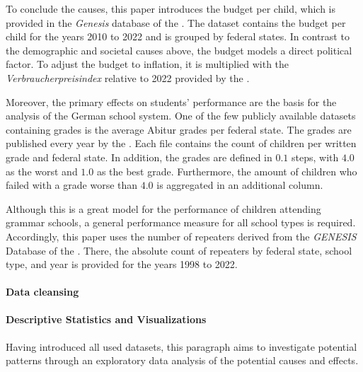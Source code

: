 To conclude the causes, this paper introduces the budget per child, which is provided in the \textit{Genesis} database of the \citeauthor{statistische_bundesamt_statistisches_2023}. The dataset contains the budget per child for the years 2010 to 2022 and is grouped by federal states. In contrast to the demographic and societal causes above, the budget models a direct political factor. To adjust the budget to inflation, it is multiplied with the \textit{Verbraucherpreisindex} relative to 2022 provided by the \citeauthor{statistische_bundesamt_statistisches_2023}. 


Moreover, the primary effects on students' performance are the basis for the analysis of the German school system. One of the few publicly available datasets containing grades is the average Abitur grades per federal state. The grades are published every year by the \citeauthor{kultusminister_konferenz_abiturnoten_nodate}. Each file contains the count of children per written grade and federal state. In addition, the grades are defined in $0.1$ steps, with $4.0$ as the worst and $1.0$ as the best grade. Furthermore, the amount of children who failed with a grade worse than $4.0$ is aggregated in an additional column. 

Although this is a great model for the performance of children attending grammar schools, a general performance measure for all school types is required. Accordingly, this paper uses the number of repeaters derived from the \textit{{GENESIS}} Database of the \citeauthor{statistische_bundesamt_statistisches_2023}. There, the absolute count of repeaters by federal state, school type, and year is provided for the years 1998 to 2022.


\paragraph{Data cleansing}

\paragraph{Descriptive Statistics and Visualizations}

Having introduced all used datasets, this paragraph aims to investigate potential patterns through an exploratory data analysis of the potential causes and effects. 

